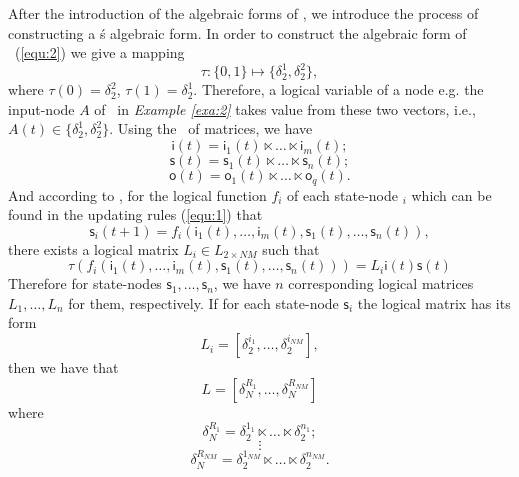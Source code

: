 After the introduction of the algebraic forms of \BCNs, we introduce the process of constructing a \BCN\' s algebraic form. In order to construct the algebraic form of \BCN\ (\ref{equ:2}) we give a mapping \[\tau:\{0,1\}\mapsto \{\delta_2^1, \delta_2^2\},\] where $\tau(0)=\delta_2^2$, $\tau(1)= \delta_2^1$. 
Therefore, a logical variable of a node e.g. the input-node $A$ of \BCN\ in {\em Example \ref{exa:2}} takes value from these two vectors, i.e., $A(t)\in \{\delta_2^1, \delta_2^2\}$. Using the \STP\ of matrices, we have 
\[\mathsf{i}(t)=\mathsf{i}_1(t)\ltimes {\ldots}\ltimes \mathsf{i}_m(t);\] 
\[\mathsf{s}(t)=\mathsf{s}_1(t)\ltimes {\ldots}\ltimes \mathsf{s}_n(t);\] 
\[\mathsf{o}(t)=\mathsf{o}_1(t)\ltimes {\ldots}\ltimes \mathsf{o}_q(t).\] 
And according to \cite{Cheng2003Semi}, for the logical function $f_i$ of each state-node \State$_i$ which can be found in the updating rules (\ref{equ:1}) that
\[\mathsf{s}_i(t+1)=f_i(\mathsf{i}_1(t),\ldots,\mathsf{i}_m(t),\mathsf{s}_1(t),\ldots,\mathsf{s}_n(t)),\] 
there exists a logical matrix $L_i\in L_{2\times {NM}}$ such that
\[\tau(f_i(\mathsf{i}_1(t),\ldots,\mathsf{i}_m(t),\mathsf{s}_1(t),\ldots,\mathsf{s}_n(t)))= L_i\mathsf{i}(t)\mathsf{s}(t)\]
Therefore for state-nodes $\mathsf{s}_1,\ldots,\mathsf{s}_n$, we have $n$ corresponding logical matrices $L_1,\ldots,L_n$ for them, respectively. 
If for each state-node $\mathsf{s}_i$ the logical matrix has its form
\[L_i=[\delta_2^{i_1},\ldots,\delta_2^{i_{NM}}],\] 
then we have that %
\[L=[\delta_N^{R_1},\ldots,\delta_N^{R_{NM}}]\]  where 
\[\delta_N^{R_1}=\delta_2^{1_1}\ltimes \ldots \ltimes \delta_2^{n_1};\]\[\vdots\] \[\delta_N^{R_{NM}}=\delta_2^{1_{NM}}\ltimes \ldots \ltimes \delta_2^{n_{NM}}.\] 


